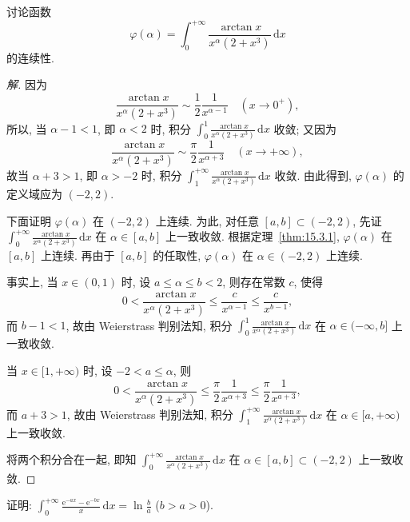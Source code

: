 \begin{example}\label{ex:15.3.1}
讨论函数
\[
  \varphi(\alpha)=\int_{0}^{+\infty}\frac{\arctan x}{x^{\alpha}(2+x^{3})}\,\mathrm{d}x
\]
的连续性.
\end{example}

\begin{proof}[解]
因为
\[
  \frac{\arctan x}{x^{\alpha}(2+x^{3})}\sim\frac{1}{2}\frac{1}{x^{\alpha-1}}\quad(x\to0^{+}),
\]
所以, 当 $\alpha-1<1$, 即 $\alpha<2$ 时, 积分 $\displaystyle\int_{0}^{1}\frac{\arctan x}{x^{\alpha}(2+x^{3})}\,\mathrm{d}x$ 收敛; 又因为
\[
  \frac{\arctan x}{x^{\alpha}(2+x^{3})}\sim\frac{\pi}{2}\frac{1}{x^{\alpha+3}}\quad(x\to+\infty),
\]
故当 $\alpha+3>1$, 即 $\alpha>-2$ 时, 积分 $\displaystyle\int_{1}^{+\infty}\frac{\arctan x}{x^{\alpha}(2+x^{3})}\,\mathrm{d}x$ 收敛. 由此得到, $\varphi(\alpha)$ 的定义域应为 $(-2,2)$.

下面证明 $\varphi(\alpha)$ 在 $(-2,2)$ 上连续. 为此, 对任意 $[a,b]\subset(-2,2)$, 先证 $\displaystyle\int_{0}^{+\infty}\frac{\arctan x}{x^{\alpha}(2+x^{3})}\,\mathrm{d}x$ 在 $\alpha\in[a,b]$ 上一致收敛. 根据定理~\ref{thm:15.3.1}, $\varphi(\alpha)$ 在 $[a,b]$ 上连续. 再由于 $[a,b]$ 的任取性, $\varphi(\alpha)$ 在 $\alpha\in(-2,2)$ 上连续.

事实上, 当 $x\in(0,1)$ 时, 设 $a\leqslant\alpha\leqslant b<2$, 则存在常数 $c$, 使得
\[
  0<\frac{\arctan x}{x^{\alpha}(2+x^{3})}\leqslant\frac{c}{x^{\alpha-1}}\leqslant\frac{c}{x^{b-1}},
\]
而 $b-1<1$, 故由 Weierstrass 判别法知, 积分 $\displaystyle\int_{0}^{1}\frac{\arctan x}{x^{\alpha}(2+x^{3})}\,\mathrm{d}x$ 在 $\alpha\in(-\infty,b]$ 上一致收敛.

当 $x\in[1,+\infty)$ 时, 设 $-2<a\leqslant\alpha$, 则
\[
  0<\frac{\arctan x}{x^{\alpha}(2+x^{3})}\leqslant\frac{\pi}{2}\frac{1}{x^{\alpha+3}}\leqslant\frac{\pi}{2}\frac{1}{x^{a+3}},
\]
而 $a+3>1$, 故由 Weierstrass 判别法知, 积分 $\displaystyle\int_{1}^{+\infty}\frac{\arctan x}{x^{\alpha}(2+x^{3})}\,\mathrm{d}x$ 在 $\alpha\in[a,+\infty)$ 上一致收敛.

将两个积分合在一起, 即知 $\displaystyle\int_{0}^{+\infty}\frac{\arctan x}{x^{\alpha}(2+x^{3})}\,\mathrm{d}x$ 在 $\alpha\in[a,b]\subset(-2,2)$ 上一致收敛.
\end{proof}

\begin{example}\label{ex:15.3.2}
证明: $\displaystyle\int_{0}^{+\infty}\frac{\mathrm{e}^{-ax}-\mathrm{e}^{-bx}}{x}\,\mathrm{d}x=\ln\frac{b}{a}$ ($b>a>0$).
\end{example}

